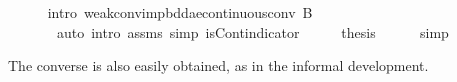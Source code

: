 \documentclass{article}
\theoremstyle{definition}
\begin{document}
\begin{isabellebody}
\ \ \ \ \isamarkupfalse%
\ {\isacharparenleft}intro\ weak{\isacharunderscore}conv{\isacharunderscore}imp{\isacharunderscore}bdd{\isacharunderscore}ae{\isacharunderscore}continuous{\isacharunderscore}conv{\isacharbrackleft}\ B{\isacharequal}{}{\isacharbrackright}{\isacharparenright}\isanewline
\ \ \ \ \ \ \ {\isacharparenleft}auto\ intro{\isacharcolon}\ assms\ simp{\isacharcolon}\ isCont{\isacharunderscore}indicator{\isacharparenright}\isanewline
\ \ \isamarkupfalse%
\ \isamarkupfalse%
\ {\isacharquery}thesis\isanewline
\ \ \ \ \isamarkupfalse%
\ simp\isanewline
{}\isamarkupfalse%
\end{isabellebody}

\medskip

The converse is also easily obtained, as in the informal development.

\medskip
\end{document}
